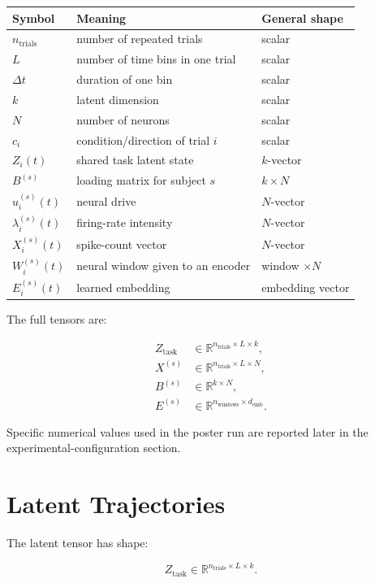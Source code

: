 \documentclass[11pt]{article}
\begin{document}
\begin{center}
\begin{tabular}{lll}
\hline
Symbol & Meaning & General shape\\
\hline
$n_{\text{trials}}$ & number of repeated trials & scalar\\
$L$ & number of time bins in one trial & scalar\\
$\Delta t$ & duration of one bin & scalar\\
$k$ & latent dimension & scalar\\
$N$ & number of neurons & scalar\\
$c_i$ & condition/direction of trial $i$ & scalar\\
$Z_i(t)$ & shared task latent state & $k$-vector\\
$B^{(s)}$ & loading matrix for subject $s$ & $k \times N$\\
$u_i^{(s)}(t)$ & neural drive & $N$-vector\\
$\lambda_i^{(s)}(t)$ & firing-rate intensity & $N$-vector\\
$X_i^{(s)}(t)$ & spike-count vector & $N$-vector\\
$W_i^{(s)}(t)$ & neural window given to an encoder & window $\times N$\\
$E_i^{(s)}(t)$ & learned embedding & embedding vector\\
\hline
\end{tabular}
\end{center}

The full tensors are:

\begin{align}
Z_{\text{task}} &\in
\mathbb{R}^{n_{\text{trials}} \times L \times k},\\
X^{(s)} &\in
\mathbb{R}^{n_{\text{trials}} \times L \times N},\\
B^{(s)} &\in
\mathbb{R}^{k \times N},\\
E^{(s)} &\in
\mathbb{R}^{n_{\text{windows}} \times d_{\text{emb}}}.
\end{align}

Specific numerical values used in the poster run are reported later in the
experimental-configuration section.

\section{Latent Trajectories}

The latent tensor has shape:

\begin{equation}
Z_{\text{task}} \in
\mathbb{R}^{n_{\text{trials}} \times L \times k}.
\end{equation}
\end{document}
